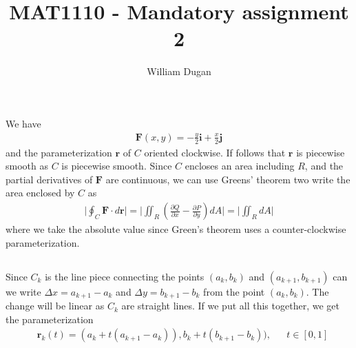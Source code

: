 \documentclass[a4paper,10pt,english]{article}
\title{MAT1110 - Mandatory assignment 2}
\author{William Dugan}
\begin{document}
\maketitle

\section{} \label{1}

\subsection{} \label{1a}

We have
\begin{align}
    \bm{F} (x, y) = - \frac{y}{2} \bm{i} + \frac{x}{2} \bm{j}
\end{align}
and the parameterization $\bm{r}$ of $C$ oriented clockwise. If follows that $\bm{r}$ is piecewise smooth as $C$ is piecewise smooth. Since $C$ encloses an area including $R$, and the partial derivatives of $\bm{F}$ are continuous, we can use Greens' theorem two write the area enclosed by $C$ as
\begin{align*}
    \Big| \oint_C \bm{F} \cdot d\bm{r} \Big| 
    = \Big| \iint_R \left( \frac{\partial Q}{\partial x} - \frac{\partial P}{\partial y} \right) dA \Big|
    = \Big| \iint_R dA \Big|
\end{align*}
where we take the absolute value since Green's theorem uses a counter-clockwise parameterization.

\subsection{} \label{1b}
Since $C_k$ is the line piece connecting the points $(a_k, b_k)$ and $(a_{k+1}, b_{k+1})$ can we write \newline $\Delta x = a_{k+1} - a_k$ and $\Delta y = b_{k+1} - b_k$ from the point $(a_k, b_k)$. The change will be linear as $C_k$ are straight lines. If we put all this together, we get the parameterization
\begin{align}
    &\bm{r}_k (t) = 
    (a_k + t (a_{k+1} - a_k)), b_k + t (b_{k+1} - b_k)), 
    & &t \in [0, 1]
\end{align}

\newpage
\end{document}
